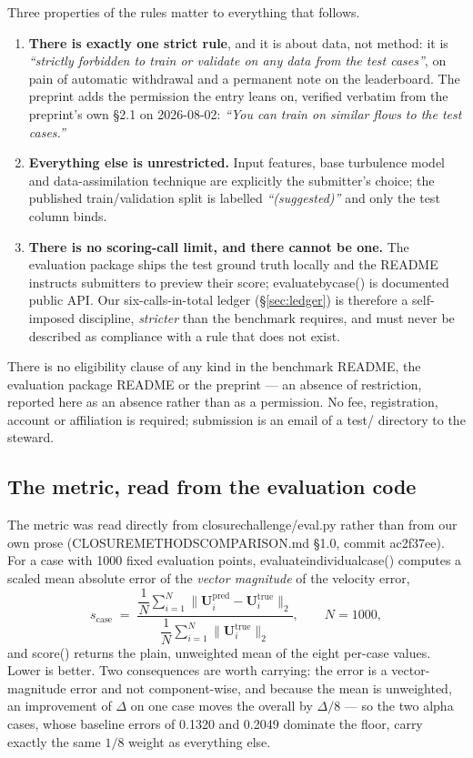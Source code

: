 \documentclass[11pt,a4paper]{article}
\newcommand{\breakus}{\textunderscore\allowbreak}
\newcommand{\code}[1]{{\small\ttfamily\let\_\breakus #1}}
\newcommand{\artifact}[1]{{\footnotesize\ttfamily\let\_\breakus #1}}
\begin{document}
Three properties of the rules matter to everything that follows.

\begin{enumerate}
\item \textbf{There is exactly one strict rule}, and it is about data, not method:
  it is \emph{``strictly forbidden to train or validate on any data from the test cases''},
  on pain of automatic withdrawal and a permanent note on the leaderboard. The preprint
  adds the permission the entry leans on, verified verbatim from the preprint's own
  \S2.1 on 2026-08-02: \emph{``You can train on similar flows to the test cases.''}
\item \textbf{Everything else is unrestricted.} Input features, base turbulence model and
  data-assimilation technique are explicitly the submitter's choice; the published
  train/validation split is labelled \emph{``(suggested)''} and only the test column binds.
\item \textbf{There is no scoring-call limit, and there cannot be one.} The evaluation
  package ships the test ground truth locally and the README instructs submitters to
  preview their score; \code{evaluate\_by\_case()} is documented public API. Our
  six-calls-in-total ledger (\S\ref{sec:ledger}) is therefore a self-imposed discipline,
  \emph{stricter} than the benchmark requires, and must never be described as compliance
  with a rule that does not exist.
\end{enumerate}

There is no eligibility clause of any kind in the benchmark README, the evaluation package
README or the preprint --- an absence of restriction, reported here as an absence rather
than as a permission. No fee, registration, account or affiliation is required; submission
is an email of a \code{test/} directory to the steward.

\subsection{The metric, read from the evaluation code}

The metric was read directly from
\code{closure\_challenge/eval.py} rather than from our own prose
(\artifact{CLOSURE\_METHODS\_COMPARISON.md} \S1.0, commit
\code{ac2f37ee}). For a case with 1000 fixed evaluation points,
\code{evaluate\_individual\_case()} computes a scaled mean absolute error of the
\emph{vector magnitude} of the velocity error,
%
\begin{equation}
s_{\text{case}} \;=\;
\frac{\dfrac{1}{N}\sum_{i=1}^{N}\bigl\lVert \mathbf{U}^{\text{pred}}_i - \mathbf{U}^{\text{true}}_i \bigr\rVert_2}
     {\dfrac{1}{N}\sum_{i=1}^{N}\bigl\lVert \mathbf{U}^{\text{true}}_i \bigr\rVert_2},
\qquad N = 1000,
\end{equation}
%
and \code{score()} returns the plain, unweighted mean of the eight per-case values. Lower
is better. Two consequences are worth carrying: the error is a vector-magnitude error and
not component-wise, and because the mean is unweighted, an improvement of $\Delta$ on one
case moves the overall by $\Delta/8$ --- so the two \code{alpha\_15} cases, whose baseline
errors of 0.1320 and 0.2049 dominate the floor, carry exactly the same $1/8$ weight as
everything else.
\end{document}
